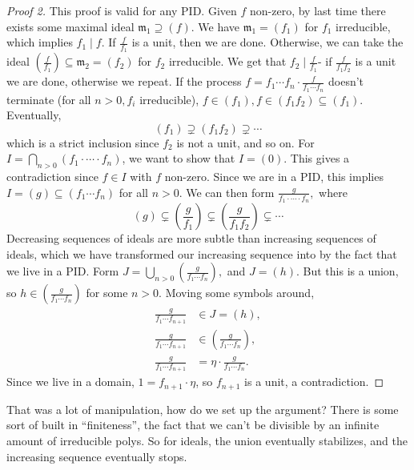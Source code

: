 \begin{proof}[Proof 2]
    This proof is valid for any PID. Given $f$ non-zero, by last time there exists some maximal ideal $\mathfrak m_1 \supseteq (f)$. We have $\mathfrak m_1=(f_1)$ for $f_1$ irreducible, which implies $f_1 \mid f$. If $\frac{f}{f_1}$ is a unit, then we are done. Otherwise, we can take the ideal $\left( \frac{f}{f_1} \right) \subseteq \mathfrak m_2=(f_2)$ for $f_2$ irreducible. We get that $f_2 \mid \frac{f}{f_1}$- if $\frac{f}{f_1f_2}$ is a unit we are done, otherwise we repeat. If the process $f=f_1 \cdots  f_n \cdot  \frac{f}{f_1 \cdots f_n }$ doesn't terminate (for all $n>0,f_i $ irreducible), $f \in (f_1), f\in (f_1f_2) \subseteq (f_1)$. Eventually, \[
        (f_1) \supsetneq (f_1f_2) \supsetneq \cdots 
    \] which is a strict inclusion since $f_2$ is not a unit, and so on. For $I= \bigcap_{n>0} (f_1 \cdot  \cdots  \cdot  f_n )$, we want to show that $I=(0)$. This gives a contradiction since $f \in I$ with $f$ non-zero. Since we are in a PID, this implies $I=(g) \subseteq (f_1 \cdots  f_n )$ for all $n >0$. We can then form $\frac{g}{f_1 \cdot  \cdots \cdot f_n },$ where \[
    (g) \subsetneq \left( \frac{g}{f_1} \right) \subsetneq \left( \frac{g}{f_1f_2} \right) \subsetneq \cdots 
\]Decreasing sequences of ideals are more subtle than increasing sequences of ideals, which we have transformed our increasing sequence into by the fact that we live in a PID. Form $J = \bigcup_{n>0} \left( \frac{g}{f_1 \cdots f_n } \right) ,$ and $J=(h)$. But this is a union, so $h \in \left( \frac{g}{f_1 \cdots f_n } \right) $ for some $n >0$. Moving some symbols around,
\begin{align*}
    \frac{g}{f_1 \cdots  f_{n+1}}& \in J=(h),\\
    \frac{g}{f_1 \cdots f _{n+1}} & \in  \left( \frac{g}{f_1 \cdots f_n } \right), \\
    \frac{g}{f_1 \cdots f_{n+1}}&=\eta \cdot \frac{g}{f_1 \cdots f_n }.
\end{align*}
Since we live in a domain, $1=f_{n+1}\cdot \eta$, so $f_{n+1}$ is a unit, a contradiction.
\end{proof}

That was a lot of manipulation, how do we set up the argument? There is some sort of built in ``finiteness'', the fact that we can't be divisible by an infinite amount of irreducible polys. So for ideals, the union eventually stabilizes, and the increasing sequence eventually stops.
